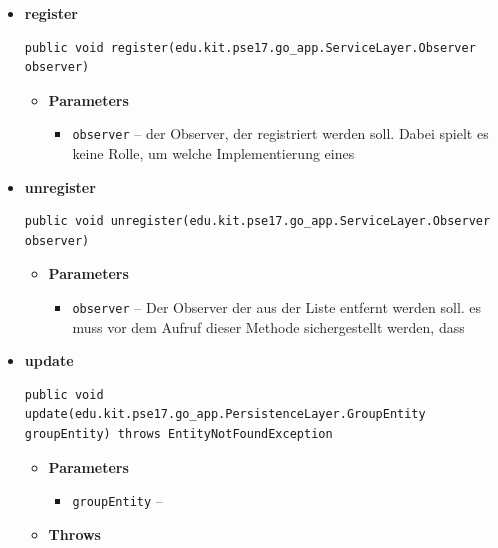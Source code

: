 \documentclass[11pt,a4paper]{article}
\begin{document}
{{{{{{{{{{{{{\begin{itemize}
{\begin{itemize}
{}%
\end{itemize}
}%
\item{ 
\hypertarget{edu.kit.pse17.go_app.PersistenceLayer.daos.GroupDaoImp.register(edu.kit.pse17.go_app.ServiceLayer.Observer)}{{\bf  register}\\}
\begin{lstlisting}[frame=none]
public void register(edu.kit.pse17.go_app.ServiceLayer.Observer observer)\end{lstlisting} %
\begin{itemize}
\item{
{\bf  Parameters}
  \begin{itemize}
   \item{
\texttt{observer} -- der Observer, der registriert werden soll. Dabei spielt es keine Rolle, um welche Implementierung eines}
  \end{itemize}
}%
\end{itemize}
}%
\item{ 
\hypertarget{edu.kit.pse17.go_app.PersistenceLayer.daos.GroupDaoImp.unregister(edu.kit.pse17.go_app.ServiceLayer.Observer)}{{\bf  unregister}\\}
\begin{lstlisting}[frame=none]
public void unregister(edu.kit.pse17.go_app.ServiceLayer.Observer observer)\end{lstlisting} %
\begin{itemize}
\item{
{\bf  Parameters}
  \begin{itemize}
   \item{
\texttt{observer} -- Der Observer der aus der Liste entfernt werden soll. es muss vor dem Aufruf dieser Methode sichergestellt werden, dass}
  \end{itemize}
}%
\end{itemize}
}%
\item{ 
\hypertarget{edu.kit.pse17.go_app.PersistenceLayer.daos.GroupDaoImp.update(edu.kit.pse17.go_app.PersistenceLayer.GroupEntity)}{{\bf  update}\\}
\begin{lstlisting}[frame=none]
public void update(edu.kit.pse17.go_app.PersistenceLayer.GroupEntity groupEntity) throws EntityNotFoundException\end{lstlisting} %
\begin{itemize}
\item{
{\bf  Parameters}
  \begin{itemize}
   \item{
\texttt{groupEntity} -- }
  \end{itemize}
}%
\item{{\bf  Throws}
}%
\end{itemize}
}%
\end{itemize}
}
}
}}}}}}}}}}}
\end{document}
